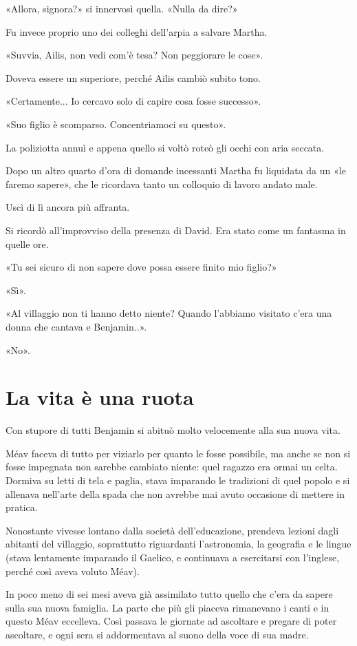 \documentclass[a4paper,10pt]{memoir}
\begin{document}
«Allora, signora?» si innervosì quella. «Nulla da dire?»

Fu invece proprio uno dei colleghi dell'arpia a salvare Martha.

«Suvvia, Ailis, non vedi com'è tesa? Non peggiorare le cose».

Doveva essere un superiore, perché Ailis cambiò subito tono.

«Certamente... Io cercavo solo di capire cosa fosse successo».

«Suo figlio è scomparso. Concentriamoci su questo».

La poliziotta annuì e appena quello si voltò roteò gli occhi con aria seccata.

Dopo un altro quarto d'ora di domande incessanti Martha fu liquidata da un «le faremo sapere», che le ricordava tanto un
colloquio di lavoro andato male.

Uscì di lì ancora più affranta.

Si ricordò all'improvviso della presenza di David. Era stato come un fantasma in quelle ore.

«Tu sei sicuro di non sapere dove possa essere finito mio figlio?»

«Sì».

«Al villaggio non ti hanno detto niente? Quando l'abbiamo visitato c'era una donna che cantava e Benjamin..».

«No».

\chapter{La vita è una ruota}

Con stupore di tutti Benjamin si abituò molto velocemente alla sua nuova vita.

Méav faceva di tutto per viziarlo per quanto le fosse possibile, ma anche se non si fosse impegnata non sarebbe cambiato
niente: quel ragazzo era ormai un celta. Dormiva su letti di tela e paglia, stava imparando le tradizioni di quel popolo
e si allenava nell'arte della spada che non avrebbe mai avuto occasione di mettere in pratica.

Nonostante vivesse lontano dalla società dell'educazione, prendeva lezioni dagli abitanti del villaggio, soprattutto
riguardanti l'astronomia, la geografia e le lingue (stava lentamente imparando il Gaelico, e continuava a esercitarsi
con l'inglese, perché così aveva voluto Méav).

In poco meno di sei mesi aveva già assimilato tutto quello che c'era da sapere sulla sua nuova famiglia. La parte che
più gli piaceva rimanevano i canti e in questo Méav eccelleva. Così passava le giornate ad ascoltare e pregare di poter
ascoltare, e ogni sera si addormentava al suono della voce di sua madre.
\end{document}
